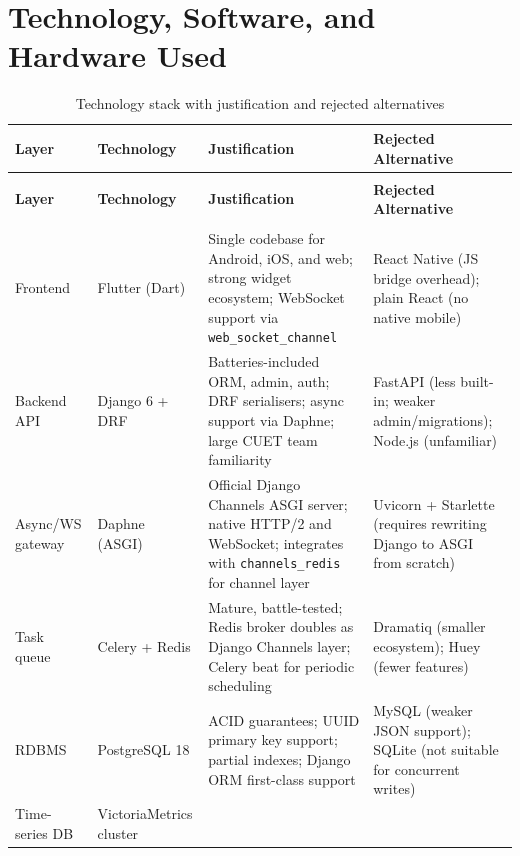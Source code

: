 \section{Technology, Software, and Hardware Used}

{\small
\begin{longtable}{@{}>{\raggedright\arraybackslash}p{}
                   >{\raggedright\arraybackslash}p{}
                   >{\raggedright\arraybackslash}p{}
                   >{\raggedright\arraybackslash}p{}@{}}
\caption{Technology stack with justification and rejected alternatives}\label{tab:stack}\\
\toprule
\textbf{Layer} & \textbf{Technology} & \textbf{Justification} & \textbf{Rejected Alternative}\\
\midrule
\endfirsthead
\multicolumn{4}{@{}l}{\textit{Table \thetable{} continued}}\\
\toprule
\textbf{Layer} & \textbf{Technology} & \textbf{Justification} & \textbf{Rejected Alternative}\\
\midrule
\endhead
\midrule
\multicolumn{4}{r@{}}{\textit{Continued on next page}}\\
\endfoot
\bottomrule
\endlastfoot
Frontend & Flutter (Dart) &
  Single codebase for Android, iOS, and web; strong widget ecosystem;
  WebSocket support via \texttt{web\_socket\_channel} &
  React Native (JS bridge overhead); plain React (no native mobile)\\
Backend API & Django 6 + DRF \cite{django2024} &
  Batteries-included ORM, admin, auth; DRF serialisers; async support
  via Daphne; large CUET team familiarity &
  FastAPI (less built-in; weaker admin/migrations); Node.js (unfamiliar)\\
Async/WS gateway & Daphne (ASGI) &
  Official Django Channels ASGI server; native HTTP/2 and WebSocket;
  integrates with \texttt{channels\_redis} for channel layer &
  Uvicorn + Starlette (requires rewriting Django to ASGI from scratch)\\
Task queue & Celery + Redis &
  Mature, battle-tested; Redis broker doubles as Django Channels layer;
  Celery beat for periodic scheduling &
  Dramatiq (smaller ecosystem); Huey (fewer features)\\
RDBMS & PostgreSQL 18 &
  ACID guarantees; UUID primary key support; partial indexes; Django
  ORM first-class support &
  MySQL (weaker JSON support); SQLite (not suitable for concurrent writes)\\
Time-series DB & VictoriaMetrics cluster \cite{victoriametrics2024} &

\end{longtable}}
